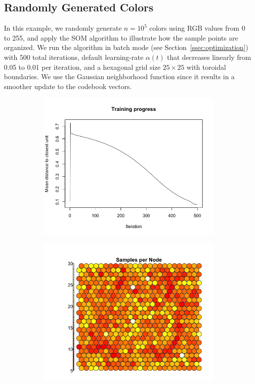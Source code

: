 \subsection{Randomly Generated Colors}\label{ssec:colors}

In this example, we randomly generate $n=10^5$ colors using RGB values from 0 to 255,
and apply the SOM algorithm to illustrate how the sample points are organized.
We run the algorithm in batch mode (see Section~\ref{ssec:optimization}) with 500 total iterations, 
default learning-rate $\alpha(t)$ that decreases linearly from 0.05 to 0.01 per iteration,
and a hexagonal grid size $25 \times 25$ with toroidal boundaries. 
We use the Gaussian neighborhood function since it results in a smoother 
update to the codebook vectors.

\begin{figure}[t]
    \centering
    \begin{subfigure}[b]{0.4\textwidth}
        \centering
        \includegraphics[width=\textwidth]{../figs/Colors-Gaussian-1.png}
        \caption{}
        \label{fig:colors-gauss-training}
    \end{subfigure}
    \begin{subfigure}[b]{0.4\textwidth}
        \centering
        \includegraphics[width=\textwidth]{../figs/Colors-Gaussian-2.png}

\end{subfigure}
\end{figure}
